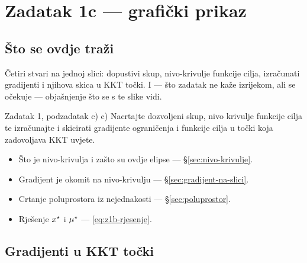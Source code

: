 \chapter{Zadatak 1c --- grafički prikaz}
\label{ch:z1-graficki}

\section{Što se ovdje traži}

Četiri stvari na jednoj slici: dopustivi skup, nivo-krivulje funkcije cilja,
izračunati gradijenti i njihova skica u KKT točki. I --- što zadatak ne kaže
izrijekom, ali se očekuje --- objašnjenje što se s te slike vidi.

\begin{zadatak}{Zadatak 1, podzadatak c)}
c) Nacrtajte dozvoljeni skup, nivo krivulje funkcije cilja te izračunajte i
skicirati gradijente ograničenja i funkcije cilja u točki koja zadovoljava KKT
uvjete.
\end{zadatak}

\begin{predznanje}
\begin{itemize}[nosep,leftmargin=*]
  \item Što je nivo-krivulja i zašto su ovdje elipse --- \S\ref{sec:nivo-krivulje}.
  \item Gradijent je okomit na nivo-krivulju --- \S\ref{sec:gradijent-na-slici}.
  \item Crtanje poluprostora iz nejednakosti --- \S\ref{sec:poluprostor}.
  \item Rješenje $x^{\star}$ i $\mu^{\star}$ --- \eqref{eq:z1b-rjesenje}.
\end{itemize}
\end{predznanje}

\section{Gradijenti u KKT točki}
\label{sec:z1c-gradijenti}

